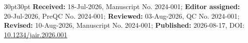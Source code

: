\documentclass{article}
\begin{document}
\vfill
\noindent
\begin{adjustwidth}{30pt}{30pt}
{\fontsize{7.5}{9}\sffamily\selectfont\color{color_29791}
\textbf{Received:} 18-Jul-2026, Manuscript No. 2024-001;
\textbf{Editor assigned:} 20-Jul-2026, PreQC No. 2024-001;
\textbf{Reviewed:} 03-Aug-2026, QC No. 2024-001;
\textbf{Revised:} 10-Aug-2026, Manuscript No. 2024-001;
\textbf{Published:} 2026-08-17,
DOI: \href{https://example.com/journal-ai}{10.1234/jair.2026.001}
}
\end{adjustwidth}
\end{document}
